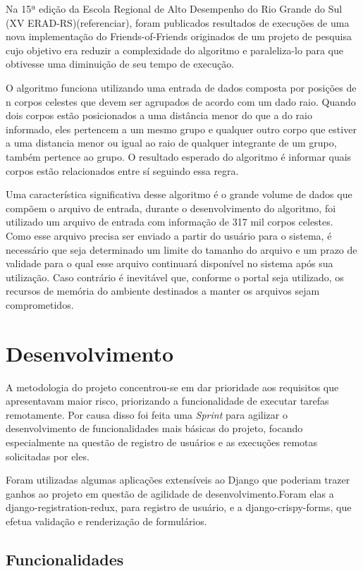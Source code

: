 \documentclass[tg]{mdtufsm}
\begin{document}
Na 15ª edição da Escola Regional de Alto Desempenho do Rio Grande do Sul (XV ERAD-RS)(referenciar), foram publicados resultados de execuções de uma nova implementação do Friends-of-Friends\cite{friends} originados de um projeto de pesquisa cujo objetivo era reduzir a complexidade do algoritmo e paraleliza-lo para que obtivesse uma diminuição de seu tempo de execução.

O algoritmo funciona utilizando uma entrada de dados composta por posições de n corpos celestes que devem ser agrupados de acordo com um dado raio. Quando dois corpos estão posicionados a uma distância menor do que a do raio informado, eles pertencem a um mesmo grupo e qualquer outro corpo que estiver a uma distancia menor ou igual ao raio de qualquer integrante de um grupo, também pertence ao grupo. O resultado esperado do algoritmo é informar quais corpos estão relacionados entre sí seguindo essa regra.

Uma característica significativa desse algoritmo é o grande volume de dados que compõem o arquivo de entrada, durante o desenvolvimento do algoritmo, foi utilizado um arquivo de entrada com informação de 317 mil corpos celestes. Como esse arquivo precisa ser enviado a partir do usuário para o sistema, é necessário que seja determinado um limite do tamanho do arquivo e um prazo de validade para o qual esse arquivo continuará disponível no sistema após sua utilização. Caso contrário é inevitável que, conforme o portal seja utilizado, os recursos de memória do ambiente destinados a manter os arquivos sejam comprometidos.


\chapter{Desenvolvimento}
A metodologia do projeto concentrou-se em dar prioridade aos requisitos que apresentavam maior risco, priorizando a funcionalidade de executar tarefas remotamente. Por causa disso foi feita uma \emph{Sprint} para agilizar o desenvolvimento de funcionalidades mais básicas do projeto, focando especialmente na questão de registro de usuários e as execuções remotas solicitadas por eles.

Foram utilizadas algumas aplicações extensíveis ao Django que poderiam trazer ganhos ao projeto em questão de agilidade de desenvolvimento.Foram elas a django-registration-redux, para registro de usuário, e a django-crispy-forms, que efetua validação e renderização de formulários.

\section{Funcionalidades}
\end{document}
